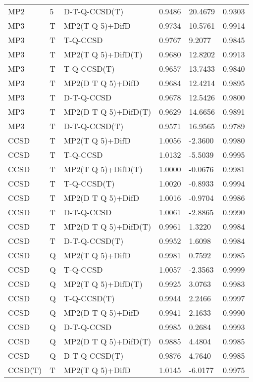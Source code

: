 \begin{table}
\begin{tabular}{l l l l l l }
    MP2 & 5 & D-T-Q-CCSD(T) & 0.9486 & 20.4679 & 0.9303 \\ 
    MP3 & T & MP2(T Q 5)+DifD & 0.9734 & 10.5761 & 0.9914 \\ 
    MP3 & T & T-Q-CCSD & 0.9767 & 9.2077 & 0.9845 \\ 
    MP3 & T & MP2(T Q 5)+DifD(T) & 0.9680 & 12.8202 & 0.9913 \\ 
    MP3 & T & T-Q-CCSD(T) & 0.9657 & 13.7433 & 0.9840 \\ 
    MP3 & T & MP2(D T Q 5)+DifD & 0.9684 & 12.4214 & 0.9895 \\ 
    MP3 & T & D-T-Q-CCSD & 0.9678 & 12.5426 & 0.9800 \\ 
    MP3 & T & MP2(D T Q 5)+DifD(T) & 0.9629 & 14.6656 & 0.9891 \\ 
    MP3 & T & D-T-Q-CCSD(T) & 0.9571 & 16.9565 & 0.9789 \\ 
    CCSD & T & MP2(T Q 5)+DifD & 1.0056 & -2.3600 & 0.9980 \\ 
    CCSD & T & T-Q-CCSD & 1.0132 & -5.5039 & 0.9995 \\ 
    CCSD & T & MP2(T Q 5)+DifD(T) & 1.0000 & -0.0676 & 0.9981 \\ 
    CCSD & T & T-Q-CCSD(T) & 1.0020 & -0.8933 & 0.9994 \\ 
    CCSD & T & MP2(D T Q 5)+DifD & 1.0016 & -0.9704 & 0.9986 \\ 
    CCSD & T & D-T-Q-CCSD & 1.0061 & -2.8865 & 0.9990 \\ 
    CCSD & T & MP2(D T Q 5)+DifD(T) & 0.9961 & 1.3220 & 0.9984 \\ 
    CCSD & T & D-T-Q-CCSD(T) & 0.9952 & 1.6098 & 0.9984 \\ 
    CCSD & Q & MP2(T Q 5)+DifD & 0.9981 & 0.7592 & 0.9985 \\ 
    CCSD & Q & T-Q-CCSD & 1.0057 & -2.3563 & 0.9999 \\ 
    CCSD & Q & MP2(T Q 5)+DifD(T) & 0.9925 & 3.0763 & 0.9983 \\ 
    CCSD & Q & T-Q-CCSD(T) & 0.9944 & 2.2466 & 0.9997 \\ 
    CCSD & Q & MP2(D T Q 5)+DifD & 0.9941 & 2.1633 & 0.9990 \\ 
    CCSD & Q & D-T-Q-CCSD & 0.9985 & 0.2684 & 0.9993 \\ 
    CCSD & Q & MP2(D T Q 5)+DifD(T) & 0.9885 & 4.4804 & 0.9985 \\ 
    CCSD & Q & D-T-Q-CCSD(T) & 0.9876 & 4.7640 & 0.9985 \\ 
    CCSD(T) & T & MP2(T Q 5)+DifD & 1.0145 & -6.0177 & 0.9975 \\ 

\end{tabular}
\end{table}

